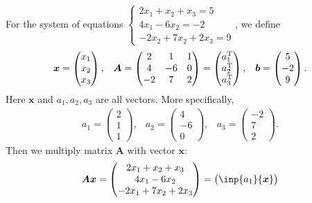 \begin{example}
For the system of equations $
\left \{	\begin{gathered}
2x_1 + x_2 +x_3=5 	\\
4x_1 - 6x_2 = -2 \\
-2x_2+7x_2+2x_3 = 9
\end{gathered}
\right.$, 
we define 
\[
\begin{array}{lll}
\bm{x} = \begin{pmatrix}
x_1 \\ x_2 \\ x_3
\end{pmatrix},&
\bm{A} = \begin{pmatrix}
2 & 1 & 1 \\ 4 & -6 & 0 \\ -2 & 7 & 2 
\end{pmatrix}
= \begin{pmatrix}
a_1^{\mathrm T} \\ a_2^{\mathrm T} \\ a_3^{\mathrm T}
\end{pmatrix},&
\bm{b} = \begin{pmatrix}
5 \\ -2 \\ 9
\end{pmatrix}.
\end{array}
\]
Here $\bm{x}$ and $a_1,a_2,a_3$ are all vectors. More specifically, 
\[
\begin{array}{lll}
a_1 = \begin{pmatrix}2 \\ 1 \\ 1\end{pmatrix},&
a_2 = \begin{pmatrix}4 \\ -6 \\ 0\end{pmatrix},&
a_3 = \begin{pmatrix}-2 \\ 7 \\ 2\end{pmatrix}.
\end{array}
\]
Then we multiply matrix $\bm{A}$ with vector $\bm{x}$:
\[
\bm{A}\bm{x} = 
\begin{pmatrix}
2x_1+x_2+x_3 \\ 4x_1-6x_2 \\ -2x_1+7x_2+2x_3
\end{pmatrix}
=\begin{pmatrix}
\inp{a_1}{\bm x}\\

\end{pmatrix}\]
\end{example}
